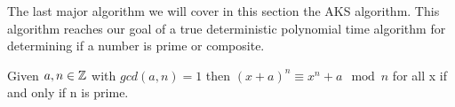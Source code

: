 \documentclass{article}
\begin{document}


The last major algorithm we will cover in this section the AKS algorithm. This algorithm reaches our goal of a true deterministic polynomial time algorithm for determining if a number is prime or composite. 
\begin{theorem}
    \label{aks1}
    Given  $a, n \in \mathbb{Z}$ with $gcd(a,n) = 1$ then $(x + a )^n \equiv x^n +a \mod n$ for all x if and only if n is prime. 
\end{theorem}
\end{document}
